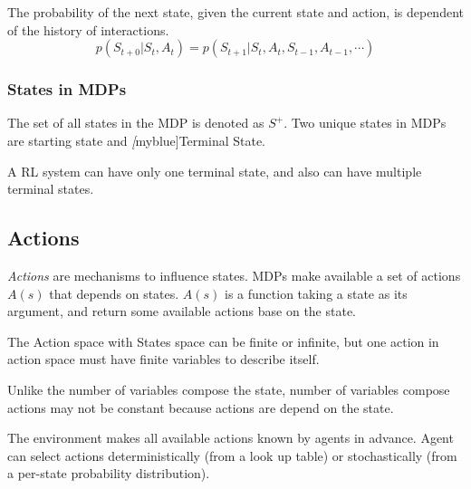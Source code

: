     \begin{definition}
         The probability of the next state, given the current state and action, is dependent of the history of interactions.
         \begin{equation}
            p(S_{t+0}|S_t, A_t) = p(S_{t+1}|S_t, A_t, S_{t-1}, A_{t-1}, \cdots)
         \end{equation}
    \end{definition}
   

    \subsubsection*{States in MDPs}
    The set of  all states in the MDP is denoted as $S^+$. Two unique states in MDPs are starting state and \emph[myblue]{Terminal State}.

    A RL system can have only one terminal state, and also can have multiple terminal states.

    \subsection{Actions}
    \emph{Actions} are mechanisms to influence states. MDPs make available a set of actions $A(s)$ that depends on states. $A(s)$ is a function taking a state as its argument, and return some available actions base on the state. \par
    The Action space with States space can be finite or infinite, but one action in action space must have finite variables to describe itself. \par
    Unlike the number of variables compose the state, number of variables compose actions may not be constant because actions are depend on the state. \par
    The environment makes all available actions known by agents in advance. Agent can select actions deterministically (from a look up table) or stochastically (from a per-state probability distribution).

